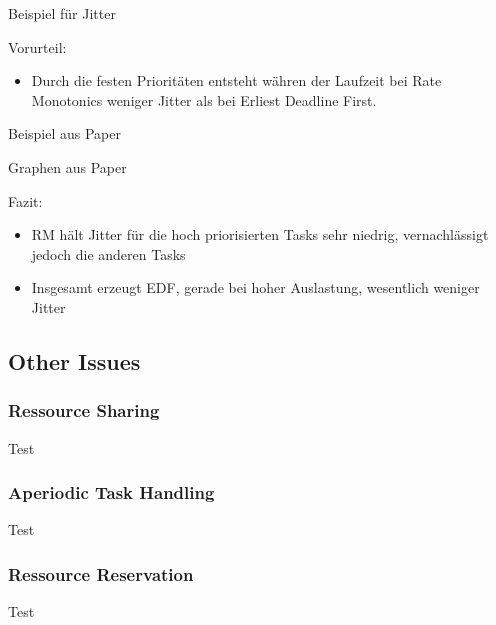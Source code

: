 \begin{frame}{\subsecname}
	Beispiel für Jitter
\end{frame}

\begin{frame}{\subsecname}
	Vorurteil:
	\begin{itemize}
		\item Durch die festen Prioritäten entsteht währen der Laufzeit bei Rate Monotonics weniger Jitter als bei Erliest Deadline First. 
	\end{itemize}
\end{frame}

\begin{frame}{\subsecname}
	Beispiel aus Paper
\end{frame}

\begin{frame}{\subsecname}
	Graphen aus Paper
\end{frame}

\begin{frame}{\subsecname}
	Fazit:
	\begin{itemize}
		\item RM hält Jitter für die hoch priorisierten Tasks sehr niedrig, vernachlässigt jedoch die anderen Tasks
		\item Insgesamt erzeugt EDF, gerade bei hoher Auslastung, wesentlich weniger Jitter
	\end{itemize}
\end{frame}

\subsection{Other Issues}
\subsubsection{Ressource Sharing}
\begin{frame}{\subsubsecname}
	Test
\end{frame}

\subsubsection{Aperiodic Task Handling}
\begin{frame}{\subsubsecname}
	Test
\end{frame}

\subsubsection{Ressource Reservation}
\begin{frame}{\subsubsecname}
	Test
\end{frame}
